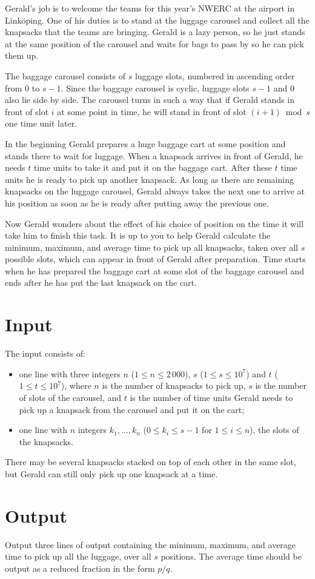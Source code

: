 
%
\noindent
Gerald's job is to welcome the teams for this year's NWERC at the
airport in Linköping.  One of his duties is to stand at the luggage carousel and
collect all the knapsacks that the teams are bringing.  Gerald is a lazy person, so he
just stands at the same position of the carousel and waits for bags
to pass by so he can pick them up.

The baggage carousel consists of $s$ luggage slots, numbered in ascending order
from $0$ to $s-1$.
Since the baggage carousel is cyclic, luggage slots $s-1$ and $0$ also lie side
by side.
The carousel turns in such a way that if Gerald stands in front of slot $i$ at some point in time,
he will stand in front of slot $(i+1) \bmod s$ one time unit later.

In the beginning Gerald prepares a huge baggage cart at some position and
stands there to wait for luggage.  When a knapsack arrives in front of
Gerald, he needs $t$ time units to take it and put it on the
baggage cart.  After these $t$ time units he is ready to pick up
another knapsack.  As long as there are remaining knapsacks on the
luggage carousel, Gerald always takes the next one to arrive at his
position as soon as he is ready after putting away the previous one.

Now Gerald wonders about the effect of his choice of position on the
time it will take him to finish this task.  It is up to you to
help Gerald calculate the minimum, maximum, and average time to pick
up all knapsacks, taken over all $s$ possible slots, which can appear
in front of Gerald after preparation.  Time
starts when he has prepared the baggage cart at some slot of the
baggage carousel and ends after he has put the last knapsack
on the cart.

\section*{Input}

The input consists of:
\begin{itemize}
   \item one line with three integers $n$ ($1\le n\le 2\,000$), $s$ ($1\le s\le 10^7$) and $t$ ($1\le t \le 10^7$), where $n$
is the number of knapsacks to pick up, $s$ is
the number of slots of the carousel, and $t$ is the
number of time units Gerald needs to pick up a knapsack from the carousel
and put it on the cart;
   \item one line with $n$ integers $k_1, \ldots, k_n$ ($0 \le k_i \le s-1$ for $1 \le i \le n$), the slots of the knapsacks.
\end{itemize}
There may be several knapsacks stacked on top of each other in the same
slot, but Gerald can still only pick up one knapsack at a time.


\section*{Output}

Output three lines of output containing the minimum, maximum, and average time to pick up all the luggage, over all $s$ positions.
The average time should be output as a reduced fraction in the form $p/q$.
